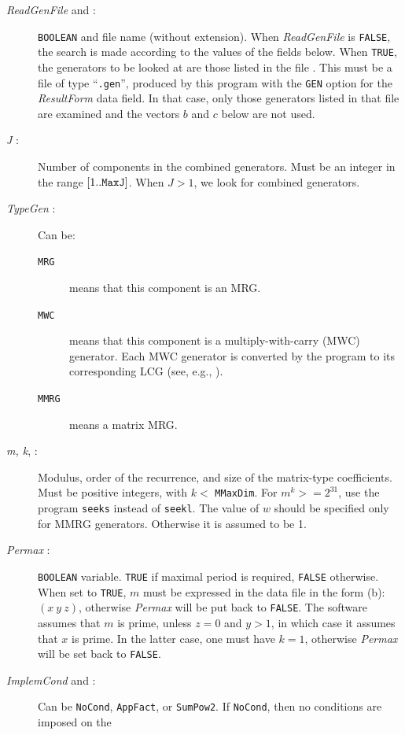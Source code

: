 \begin {description}
%
\item [{\em ReadGenFile} and \> :]
  {\tt BOOLEAN} and file name (without extension).
  When {\em ReadGenFile} is {\tt FALSE},
  the search is made according to the values of the fields below.
  When {\tt TRUE}, the generators to be looked at are those
  listed in the file .
  This must be a file of type ``{\tt .gen}'', produced by this program
  with the {\tt GEN} option for the {\em ResultForm} data field.
  In that case, only those generators listed in that file are examined
  and the vectors $b$ and $c$ below are not used.
%
\item [{\em J} :]
  Number of components in the combined generators.
  Must be an integer in the range $[1..{\tt MaxJ}]$.
  When $J > 1$, we look for combined generators.
%
\item [{\em TypeGen} :] Can be:
  \begin {description}
  \item [{\tt MRG}] means that this component is an MRG.
  \item [{\tt MWC}] means that this component is a multiply-with-carry 
    (MWC) generator.
    Each MWC generator is converted by the program to its
    corresponding LCG (see, e.g., \cite{rCOU97a,rLEC98a}).
  \item [{\tt MMRG}] means a matrix MRG.
  \end {description}
%
\item [{\em m, k}, \> :]
  Modulus, order of the recurrence, and size of the matrix-type 
  coefficients.
  Must be positive integers, with $k<$ {\tt MMaxDim}.
  For $m^k >= 2^{31}$, use the program {\tt seeks} instead of {\tt seekl}.
  The value of $w$ should be specified only for MMRG generators.
  Otherwise it is assumed to be 1.
%
\item [{\em Permax} :]
  {\tt BOOLEAN} variable.  
  {\tt TRUE} if maximal period is required, {\tt FALSE} otherwise.
  When set to {\tt TRUE}, $m$ must be expressed in the data file in the
  form (b): $(x\ y\ z)$, otherwise {\em Permax\/} will be put back to
  {\tt FALSE}.  The software assumes that $m$ is prime, 
  unless $z=0$ and $y > 1$, in which case it assumes that $x$ is prime.
  In the latter case, one must have $k=1$, otherwise {\em Permax\/}
  will be set back to {\tt FALSE}.
%
\item [{\em ImplemCond} and \> :]
  Can be {\tt NoCond}, {\tt AppFact}, or {\tt SumPow2}.
  If {\tt NoCond}, then no conditions are imposed on the

\end{description}
